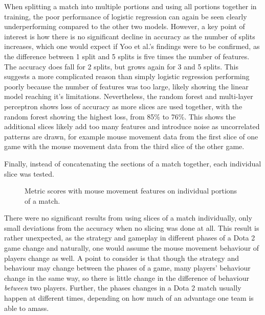 \documentclass[Report.tex]{subfiles}
\newcommand{\lineaxis}[5]{
\begin{axis}[
    title={#1},
    grid=major,
    xmax=5, xmin=1,
    width=#3,
    height=#4,
    legend style={at={#5},anchor=north,legend columns=-1},
    enlarge x limits=0.4,
	xlabel={Portion of match},
    ylabel={#2}
]
}
\newcommand{\plotline}[4]{
\addplot+[
	discard if not={numSplits}{5},
	discard if not={model}{#1},
	discard if not={features}{#2}
] table [x=split, y=#3, col sep=comma] {data/19-pair-cv.csv};
\addlegendentry{#4}
}
\begin{document}
When splitting a match into multiple portions and using all portions together in training, the poor performance of logistic regression can again be seen clearly underperforming compared to the other two models. However, a key point of interest is how there is no significant decline in accuracy as the number of splits increases, which one would expect if Yoo et al.'s \cite{lr-vs-rf} findings were to be confirmed, as the difference between 1 split and 5 splits is five times the number of features. The accuracy does fall for 2 splits, but grows again for 3 and 5 splits. This suggests a more complicated reason than simply logistic regression performing poorly because the number of features was too large, likely showing the linear model reaching it's limitations. Nevertheless, the random forest and multi-layer perceptron shows loss of accuracy as more slices are used together, with the random forest showing the highest loss, from 85\% to 76\%. This shows the additional slices likely add too many features and introduce noise as uncorrelated patterns are drawn, for example mouse movement data from the first slice of one game with the mouse movement data from the third slice of the other game. 


Finally, instead of concatenating the sections of a match together, each individual slice was tested.

\begin{figure}[H]
\centering
{}
\caption{Metric scores with mouse movement features on individual portions of a match. }
\end{figure}

There were no significant results from using slices of a match individually, only small deviations from the accuracy when no slicing was done at all. This result is rather unexpected, as the strategy and gameplay in different phases of a Dota 2 game change and naturally, one would assume the mouse movement behaviour of players change as well. A point to consider is that though the strategy and behaviour may change between the phases of a game, many players' behaviour change in the same way, so there is little change in the difference of behaviour \textit{between} two players. Further, the phases changes in a Dota 2 match usually happen at different times, depending on how much of an advantage one team is able to amass. 
\end{document}
